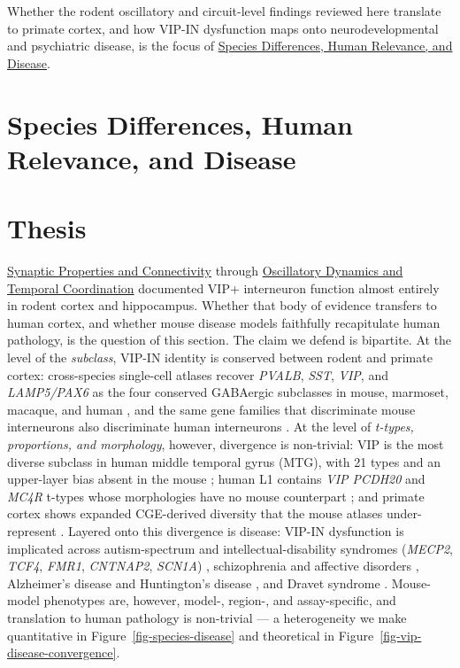 \documentclass[11pt]{article}
\begin{document}
Whether the rodent oscillatory and circuit-level findings reviewed here translate to primate cortex, and how VIP-IN dysfunction maps onto neurodevelopmental and psychiatric disease, is the focus of \href{/disease-translational}{Species Differences, Human Relevance, and Disease}.


\section{Species Differences, Human Relevance, and Disease}
\label{sec:11_disease_translational}

\section{Thesis}

\href{/synaptic-properties}{Synaptic Properties and Connectivity} through \href{/oscillatory-dynamics}{Oscillatory Dynamics and Temporal Coordination} documented VIP+ interneuron function almost entirely in rodent
cortex and hippocampus. Whether that body of evidence transfers to human
cortex, and whether mouse disease models faithfully recapitulate human
pathology, is the question of this section. The claim we defend is bipartite.
At the level of the \textit{subclass}, VIP-IN identity is conserved between rodent
and primate cortex: cross-species single-cell atlases recover \textit{PVALB}, \textit{SST},
\textit{VIP}, and \textit{LAMP5/PAX6} as the four conserved GABAergic subclasses in mouse,
marmoset, macaque, and human \citep{Tasic2018, Hodge2019, Bakken2021a, Braininitiativecellcensusnetworkbiccn2021, Lee2023a, Yao2023},
and the same gene families that discriminate mouse interneurons also
discriminate human interneurons \citep{Hodge2019}. At the level of \textit{t-types,
proportions, and morphology}, however, divergence is non-trivial: VIP is the
most diverse subclass in human middle temporal gyrus (MTG), with 21 types and
an upper-layer bias absent in the mouse \citep{Hodge2019}; human L1 contains
\textit{VIP PCDH20} and \textit{MC4R} t-types whose morphologies have no mouse counterpart
\citep{Chartrand2023, Boldog2018}; and primate cortex shows expanded
CGE-derived diversity that the mouse atlases under-represent
\citep{Bakken2021a, Bakken2021b, Krienen2020}. Layered onto this divergence is
disease: VIP-IN dysfunction is implicated across autism-spectrum and
intellectual-disability syndromes (\textit{MECP2}, \textit{TCF4}, \textit{FMR1}, \textit{CNTNAP2},
\textit{SCN1A}) \citep{Mossner2020, Chen2023b, Bhandari2024, Goff2023, Hanno2026, Gil2024},
schizophrenia and affective disorders \citep{Batistabrito2017, Miller2025, Prevot2025},
Alzheimer's disease and Huntington's disease
\citep{Michaud2024}, and Dravet syndrome
\citep{Goff2023, Vormsteinschneider2020, Gil2024}. Mouse-model phenotypes are,
however, model-, region-, and assay-specific, and translation to human
pathology is non-trivial --- a heterogeneity we make quantitative in
Figure~\ref{fig-species-disease} and theoretical in
Figure~\ref{fig-vip-disease-convergence}.
\end{document}
